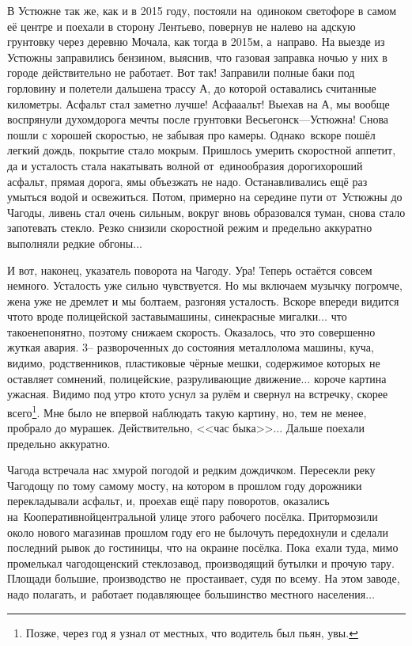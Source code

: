 В Устюжне так же, как и в 2015 году, постояли на~одиноком светофоре в самом её центре и поехали в сторону Лентьево, повернув не налево на адскую грунтовку через деревню Мочала, как тогда в 2015\sdash м, а~направо. На выезде из Устюжны заправились бензином, выяснив, что газовая заправка ночью у них в городе действительно не работает. Вот так! Заправили полные баки под горловину и полетели дальше\mdash на трассу А, до которой оставались считанные километры. Асфальт стал заметно лучше! Асфа\sdash а\sdash альт! Выехав на А, мы вообще воспрянули духом\mdash дорога мечты после грунтовки Весьегонск\thinspace\nobreakdash---\thinspace Устюжна! Снова пошли с хорошей скоростью, не забывая про камеры. Однако~вскоре пошёл легкий дождь, покрытие стало мокрым. Пришлось умерить скоростной аппетит, да и усталость стала накатывать волной от~единообразия дороги\mdash хороший асфальт, прямая дорога, ямы объезжать не надо. Останавливались ещё раз умыться водой и освежиться. Потом, примерно на середине пути от~Устюжны до Чагоды, ливень стал очень сильным, вокруг вновь образовался туман, снова стало запотевать стекло. Резко снизили скоростной режим и предельно аккуратно выполняли редкие обгоны$\ldots$

И вот, наконец, указатель поворота на Чагоду. Ура! Теперь остаётся совсем немного. Усталость уже сильно чувствуется. Но мы включаем музычку погромче, жена уже не дремлет и мы болтаем, разгоняя усталость. Вскоре впереди видится что\sdash то вроде полицейской заставы\mdash машины, сине\sdash красные мигалки$\ldots$ что такое\mdash непонятно, поэтому снижаем скорость. Оказалось, что это совершенно жуткая авария. 3\thinspace\nobreakdash-- развороченных до состояния металлолома машины, куча, видимо, родственников, пластиковые чёрные мешки, содержимое которых не оставляет сомнений, полицейские, разруливающие движение$\ldots$ короче картина ужасная. Видимо под утро кто\sdash то уснул за рулём и свернул на встречку, скорее всего\footnote{Позже, через год я узнал от местных, что водитель был пьян, увы.}. Мне было не впервой наблюдать такую картину, но, тем не менее, пробрало до мурашек. Действительно, <<час быка>>$\ldots$ Дальше поехали предельно аккуратно.

Чагода встречала нас хмурой погодой и редким дождичком. Пересекли реку Чагодощу по тому самому мосту, на котором в прошлом году дорожники перекладывали асфальт, и, проехав ещё пару поворотов, оказались на~Кооперативной\mdash центральной улице этого рабочего посёлка. Притормозили около нового магазина\mdash в прошлом году его не было\mdash чуть передохнули и сделали последний рывок до гостиницы, что на окраине посёлка. Пока~ехали туда, мимо промелькал чагодощенский стеклозавод, производящий бутылки и прочую тару. Площади большие, производство не~простаивает, судя по всему. На этом заводе, надо полагать, и~работает подавляющее большинство местного населения$\ldots$


